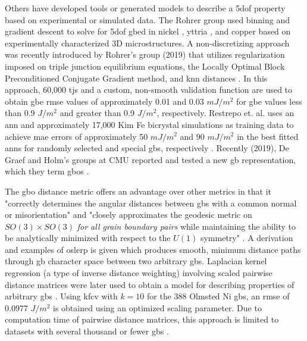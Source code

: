 \documentclass[preprint,12pt]{elsarticle}
\begin{document}
Others have developed tools or generated models to describe a \gls{5dof} property based on experimental or simulated data. The Rohrer group used binning and gradient descent to solve for \gls{5dof} \gls{gbed} in nickel \cite{liRelativeGrainBoundary2009}, yttria \cite{dillonCharacterizationGrainboundaryCharacter2009}, and copper \cite{randleFiveparameterGrainBoundary2008} based on experimentally characterized 3D microstructures. A non-discretizing approach was recently introduced by Rohrer's group (2019) that utilizes regularization imposed on triple junction equilibrium equations, the Locally Optimal Block Preconditioned Conjugate Gradient method, and \gls{knn} distances \cite{shenDeterminingGrainBoundary2019}. In this approach, 60,000 \glspl{tj} and a custom, non-smooth validation function are used to obtain \gls{gbe} \gls{rmse} values of approximately 0.01 and 0.03 $mJ/m^2$ for \gls{gbe} values less than 0.9 $J/m^2$ and greater than 0.9 $J/m^2$, respectively. Restrepo et. al. uses an \gls{ann} and approximately 17,000 Kim Fe bicrystal simulations \cite{kimIdentificationSchemeGrain2011} as training data to achieve \gls{mae} errors of approximately 50 $mJ/m^2$ and 90 $mJ/m^2$ in the best fitted \glspl{ann} for randomly selected and special \glspl{gb}, respectively \cite{echeverrirestrepoUsingArtificialNeural2014}. Recently (2019), De Graef and Holm's groups at CMU reported and tested a new \gls{gb} representation, which they term \glspl{gbo} \cite{francisGeodesicOctonionMetric2019,chesserLearningGrainBoundary2020}.

The \gls{gbo} distance metric offers an advantage over other metrics in that it "correctly determines the angular distances between \glspl{gb} with a common normal or misorientation" and "closely approximates the geodesic metric on $SO(3) \times SO(3)$ \textit{for all grain boundary pairs} while maintaining the ability to be analytically minimized with respect to the $U(1)$ symmetry" \cite{francisGeodesicOctonionMetric2019}. A derivation and examples of \gls{oslerp} is given which produces smooth, minimum distance paths through \gls{gb} character space between two arbitrary \glspl{gb}. Laplacian kernel regression (a type of inverse distance weighting) involving scaled pairwise distance matrices were later used to obtain a model for describing properties of arbitrary \glspl{gb} \cite{chesserLearningGrainBoundary2020}. Using \gls{kfcv} with $k=10$ for the 388 Olmsted Ni \glspl{gb}, an \gls{rmse} of 0.0977 $J/m^2$ is obtained using an optimized scaling parameter. Due to computation time of pairwise distance matrices, this approach is limited to datasets with several thousand or fewer \glspl{gb} \cite{chesserLearningGrainBoundary2020}.
\end{document}
